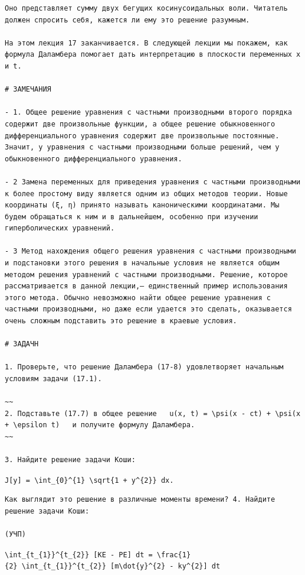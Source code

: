 \documentclass[
  ukrainian,
]{article}
\begin{document}
\begin{verbatim}
Оно представляет сумму двух бегущих косинусоидальных воли. Читатель должен спросить себя, кажется ли ему это решение разумным.

На этом лекция 17 заканчивается. В следующей лекции мы покажем, как формула Даламбера помогает дать интерпретацию в плоскости переменных x и t.

# ЗАМЕЧАНИЯ

- 1. Общее решение уравнения с частными производными второго порядка содержит две произвольные функции, а общее решение обыкновенного дифференциального уравнения содержит две произвольные постоянные. Значит, у уравнения с частными производными больше решений, чем у обыкновенного дифференциального уравнения.

- 2 Замена переменных для приведения уравнения с частными производными к более простому виду является одним из общих методов теории. Новые координаты (ξ, η) принято называть каноническими координатами. Мы будем обращаться к ним и в дальнейшем, особенно при изучении гиперболических уравнений.

- 3 Метод нахождения общего решения уравнения с частными производными и подстановки этого решения в начальные условия не является общим методом решения уравнений с частными производными. Решение, которое рассматривается в данной лекции,— единственный пример использования этого метода. Обычно невозможно найти общее решение уравнения с частными производными, но даже если удается это сделать, оказывается очень сложным подставить это решение в краевые условия.

# ЗАДАЧН

1. Проверьте, что решение Даламбера (17-8) удовлетворяет начальным условиям задачи (17.1).

~~
2. Подставьте (17.7) в общее решение   u(x, t) = \psi(x - ct) + \psi(x + \epsilon t)   и получите формулу Даламбера.
~~

3. Найдите решение задачи Коши:
\end{verbatim}

\texttt{J{[}y{]}\ =\ \textbackslash{}int\_\{0\}\^{}\{1\}\ \textbackslash{}sqrt\{1\ +\ y\textquotesingle{}\^{}\{2\}\}\ dx.}

\begin{verbatim}
Как выглядит это решение в различные моменты времени? 4. Найдите решение задачи Коши:

(УЧП)
\end{verbatim}

\texttt{\textbackslash{}int\_\{t\_\{1\}\}\^{}\{t\_\{2\}\}\ {[}KE\ -\ PE{]}\ dt\ =\ \textbackslash{}frac\{1\}\{2\}\ \textbackslash{}int\_\{t\_\{1\}\}\^{}\{t\_\{2\}\}\ {[}m\textbackslash{}dot\{y\}\^{}\{2\}\ -\ ky\^{}\{2\}{]}\ dt}
\end{document}
